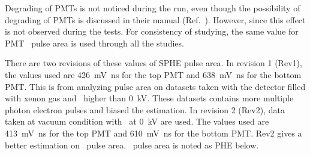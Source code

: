 Degrading of PMTs is not noticed during the run, even though the possibility of degrading of PMTs is discussed in their manual (Ref.~\cite{HamamatsuPhotonics2006}). However, since this effect is not observed during the tests. For consistency of studying, the same value for PMT \sphe\ pulse area is used through all the studies. 

There are two revisions of these values of SPHE pulse area. In revision 1 (Rev1), the values used are \SI{426}{\mV\ns} for the top PMT and \SI{638}{\mV\ns} for the bottom PMT. This is from analyzing pulse area on datasets taken with the detector filled with xenon gas and \opvtvb\ higher than \SI{0}{\kV}. These datasets contains more multiple photon electron pulses and biased the estimation. In revision 2 (Rev2), data taken at vacuum condition with \opvtvb\ at \SI{0}{\kV} are used. The values used are \SI{413}{\mV\ns} for the top PMT and \SI{610}{\mV\ns} for the bottom PMT. Rev2 gives a better estimation on \sphe\ pulse area. \sphe\ pulse area is noted as PHE below.

